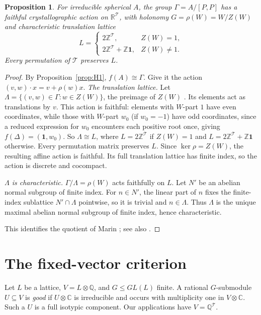 \documentclass[11pt]{amsart}
\newtheorem{proposition}[theorem]{Proposition}
\theoremstyle{definition}
\newcommand{\Z}{\mathbb{Z}}
\newcommand{\Q}{\mathbb{Q}}
\newcommand{\C}{\mathbb{C}}
\newcommand{\T}{\mathcal{T}}
\begin{document}
\begin{proposition}\label{prop:translation-lattice}
For irreducible spherical $A$, the group $\Gamma=A/[P,P]$ has a faithful crystallographic action
on $\mathbb R^\T$, with holonomy $G=\rho(W)=W/Z(W)$ and characteristic translation lattice
\[
 L=\begin{cases}2\Z^\T,&Z(W)=1,\\2\Z^\T+\Z\mathbf1,&Z(W)\ne1.\end{cases}
\]
Every permutation of $\T$ preserves $L$.
\end{proposition}
\begin{proof}
By Proposition~\ref{prop:H1}, $f(A)\cong\Gamma$. Give it the action
$(v,w)\cdot x=v+\rho(w)x$.
\emph{The translation lattice.} Let $\Lambda=\{(v,w)\in\Gamma: w\in Z(W)\}$, the preimage of $Z(W)$ \cite[Thm.~2.1]{Mar15}.
Its elements act as translations by $v$. This action is faithful: elements with $W$-part $1$ have even coordinates,
while those with $W$-part $w_0$ (if $w_0=-1$) have odd coordinates, since a reduced expression for $w_0$ encounters each positive root once, giving
$f(\Delta)=(\mathbf1,w_0)$. So
$\Lambda\cong L$, where $L=2\Z^\T$ if $Z(W)=1$ and $L=2\Z^\T+\Z\mathbf 1$ otherwise. Every permutation matrix preserves $L$.
Since $\ker\rho=Z(W)$, the resulting affine action is faithful. Its full translation lattice has finite
index, so the action is discrete and cocompact.

\emph{$\Lambda$ is characteristic.} $\Gamma/\Lambda=\rho(W)$ acts faithfully on $L$. Let $N'$ be an abelian normal subgroup
of finite index. For $n\in N'$, the linear part of $n$ fixes the finite-index sublattice $N'\cap\Lambda$ pointwise, so it
is trivial and $n\in\Lambda$. Thus $\Lambda$ is the unique maximal abelian normal subgroup of finite index, hence
characteristic.

This identifies the quotient of Marin \cite[Thm.~2.1, Cor.~2.2]{Mar15}; see also
\cite{GGO17,DKNS24}.
\end{proof}

\section{The fixed-vector criterion}\label{sec:criterion}

Let $L$ be a lattice, $V=L\otimes\Q$, and $G\le GL(L)$ finite. A rational $G$-submodule
$U\subseteq V$ is \emph{good} if $U\otimes\C$ is irreducible and occurs with multiplicity one in
$V\otimes\C$. Such a $U$ is a full isotypic component. Our applications have $V=\Q^\T$.
\end{document}
